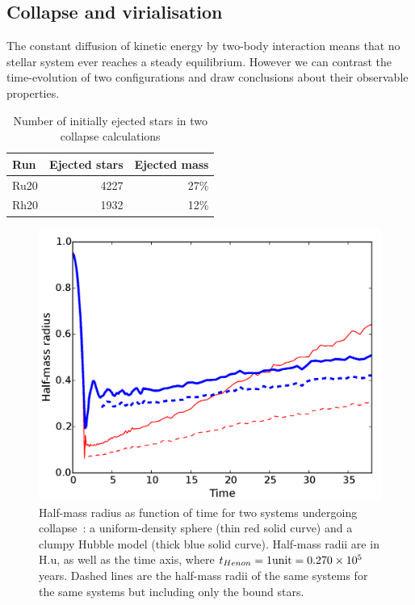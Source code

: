 \subsection{Collapse and virialisation}
\label{Subsec:Collapse}
The constant diffusion of kinetic energy by two-body interaction means that no stellar system ever reaches a steady equilibrium. However we can contrast the time-evolution of two configurations and draw conclusions about their observable properties. 

\begin{table}
\caption{Number of initially ejected stars in two collapse calculations} \label{tab:Ejectedstars}
\begin{tabular}{lrr}
Run & Ejected stars & Ejected mass  \\
\hline
Ru20  &  4227 & 27\% \\
Rh20  &  1932 & 12\% \\
\hline
\end{tabular}
\end{table}







\begin{figure}
\begin{center}
\includegraphics[width=\columnwidth]{Figures/3_Rhm_global}
\caption{Half-mass radius as function of time for two systems undergoing collapse~: a uniform-density sphere (thin red solid curve) and a clumpy Hubble model (thick blue solid curve). Half-mass radii are in H.u, as well as the time axis, where $t_{Henon} = 1 {\rm unit} =  0.270 \times 10^5 $ years. Dashed lines are the half-mass radii of the same systems for the same systems but including only the bound stars.}
\label{Fig:3_Rhm_global}
\end{center}
\end{figure}





